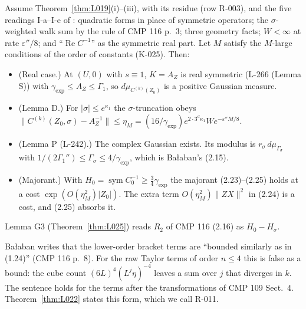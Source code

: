 \begin{theorem}\label{thm:L021}
Assume Theorem~\ref{thm:L019}(i)--(iii), with its residue (row R-003), and the five readings I-a--I-e of : quadratic forms in place of symmetric operators; the $\sigma$-weighted walk sum by the rule of CMP 116 p.~3; three geometry facts; $W<\infty$ at rate $\varepsilon''/8$; and ``$\operatorname{Re}C^{-1}$'' as the symmetric real part. Let $M$ satisfy the $M$-large conditions of the order of constants (K-025). Then:
\begin{itemize}
\item[(R)] (Real case.) At $(U,0)$ with $s\equiv1$, $K=A_Z$ is real symmetric (L-266 (Lemma S)) with $\gamma_{\exp}\le A_Z\le\Gamma_1$, so $d\mu_{C^{(k)}(Z_0)}$ is a positive Gaussian measure.
\item[(D)] (Lemma D.) For $|\sigma|\le e^{\kappa_1}$ the $\sigma$-truncation obeys $\|C^{(k)}(Z_0,\sigma)-A_Z^{-1}\|\le\eta_M=(16/\gamma_{\exp})e^{2\cdot3^d\kappa_1}We^{-\varepsilon''M/8}$.
\item[(P)] (Lemma P (L-242).) The complex Gaussian exists. Its modulus is $r_\sigma\,d\mu_{\Gamma_\sigma}$ with $1/(2\Gamma_1'')\le\Gamma_\sigma\le4/\gamma_{\exp}$, which is Ba{\l}aban's (2.15).
\item[(M)] (Majorant.) With $H_0=\operatorname{sym}C_0^{-1}\ge\tfrac34\gamma_{\exp}$ the majorant (2.23)--(2.25) holds at a cost $\exp(O(\eta_M^2)|Z_0|)$. The extra term $O(\eta_M^2)\|ZX\|^2$ in (2.24) is a cost, and (2.25) absorbs it.
\end{itemize}
\end{theorem}
Lemma G3 (Theorem~\ref{thm:L025}) reads $R_2$ of CMP 116 (2.16) as $H_0-H_\sigma$.

\begin{remark}[CMP 116 p.~8]\label{src:R010-remark}
Ba{\l}aban writes that the lower-order bracket terms are ``bounded similarly as in (1.24)'' (CMP 116 p.~8). For the raw Taylor terms of order $n\le4$ this is false as a bound: the cube count $(6L)^4(L^j\eta)^{-4}$ leaves a sum over $j$ that diverges in $k$. The sentence holds for the terms after the transformations of CMP 109 Sect.~4. Theorem~\ref{thm:L022} states this form, which we call R-011.
\end{remark}


